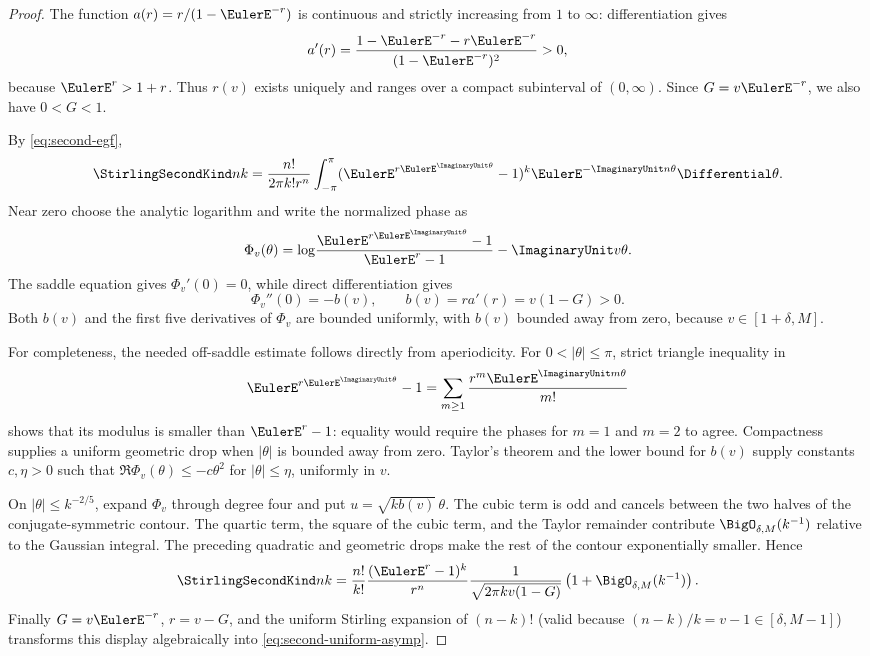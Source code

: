 \documentclass[11pt,a4paper,oneside,openany]{book}
\theoremstyle{definition}
\theoremstyle{remark}
\begin{document}
\begin{proof}
The function $a(r)=r/(1-\EulerE^{-r})$ is continuous and strictly increasing
from $1$ to $\infty$: differentiation gives
\[
 a'(r)=\frac{1-\EulerE^{-r}-r\EulerE^{-r}}
              {(1-\EulerE^{-r})^2}>0,
\]
because $\EulerE^r>1+r$.  Thus $r(v)$ exists uniquely and ranges over a compact
subinterval of $(0,\infty)$.  Since $G=v\EulerE^{-r}$, we also have
$0<G<1$.

By \cref{eq:second-egf},
\[
 \StirlingSecondKind nk
 =\frac{n!}{2\pi k!r^n}\int_{-\pi}^{\pi}
   (\EulerE^{r\EulerE^{\ImaginaryUnit\theta}}-1)^k
   \EulerE^{-\ImaginaryUnit n\theta}\Differential\theta.
\]
Near zero choose the analytic logarithm and write the normalized phase as
\[
 \Phi_v(\theta)=
 \log\!\frac{\EulerE^{r\EulerE^{\ImaginaryUnit\theta}}-1}{\EulerE^r-1}
 -\ImaginaryUnit v\theta.
\]
The saddle equation gives $\Phi_v'(0)=0$, while direct differentiation gives
\[
 \Phi_v''(0)=-b(v),\qquad b(v)=r a'(r)=v(1-G)>0.
\]
Both $b(v)$ and the first five derivatives of $\Phi_v$ are bounded uniformly,
with $b(v)$ bounded away from zero, because $v\in[1+\delta,M]$.

For completeness, the needed off-saddle estimate follows directly from
aperiodicity.  For $0<|\theta|\le\pi$, strict triangle inequality in
\[
 \EulerE^{r\EulerE^{\ImaginaryUnit\theta}}-1
 =\sum_{m\ge1}\frac{r^m\EulerE^{\ImaginaryUnit m\theta}}{m!}
\]
shows that its modulus is smaller than $\EulerE^r-1$: equality would require the
phases for $m=1$ and $m=2$ to agree.  Compactness supplies a uniform geometric
drop when $|\theta|$ is bounded away from zero.  Taylor's theorem and the lower
bound for $b(v)$ supply constants $c,\eta>0$ such that
$\Re\Phi_v(\theta)\le-c\theta^2$ for $|\theta|\le\eta$, uniformly in $v$.

On $|\theta|\le k^{-2/5}$, expand $\Phi_v$ through degree four and put
$u=\sqrt{k b(v)}\,\theta$.  The cubic term is odd and cancels between the two
halves of the conjugate-symmetric contour.  The quartic term, the square of the
cubic term, and the Taylor remainder contribute $\BigO_{\delta,M}(k^{-1})$ relative
to the Gaussian integral.  The preceding quadratic and geometric drops make the
rest of the contour exponentially smaller.  Hence
\[
 \StirlingSecondKind nk
 =\frac{n!}{k!}\frac{(\EulerE^r-1)^k}{r^n}
   \frac{1}{\sqrt{2\pi k v(1-G)}}
   \left(1+\BigO_{\delta,M}(k^{-1})\right).
\]
Finally $G=v\EulerE^{-r}$, $r=v-G$, and the uniform Stirling expansion of
$(n-k)!$ (valid because $(n-k)/k=v-1\in[\delta,M-1]$) transforms this display
algebraically into \cref{eq:second-uniform-asymp}.
\end{proof}
\end{document}
